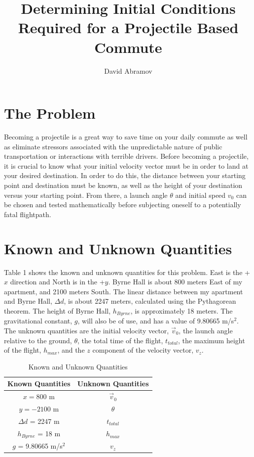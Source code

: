 \documentclass[11pt, oneside]{article}   	%
\title{Determining Initial Conditions Required for a Projectile Based Commute}
\author{David Abramov}
\begin{document}
\maketitle
\section{The Problem}

Becoming a projectile is a great way to save time on your daily commute as well as eliminate stressors associated with the unpredictable nature of public transportation or interactions with terrible drivers. Before becoming a projectile, it is crucial to know what your initial velocity vector must be in order to land at your desired destination. In order to do this, the distance between your starting point and destination must be known, as well as the height of your destination versus your starting point. From there, a launch angle $\theta$ and initial speed $v_{0}$ can be chosen and tested mathematically before subjecting oneself to a potentially fatal flightpath.

\section{Known and Unknown Quantities}

Table 1 shows the known and unknown quantities for this problem. East is the +$x$ direction and North is in the +$y$. Byrne Hall is about 800 meters East of my apartment, and 2100 meters South. The linear distance between my apartment and Byrne Hall, $\Delta d$, is about 2247 meters, calculated using the Pythagorean theorem. The height of Byrne Hall, $h_{Byrne}$, is approximately 18 meters. The gravitational constant, $g$, will also be of use, and has a value of 9.80665 m/s$^2$. The unknown quantities are the initial velocity vector, $\vec{v}_{0}$, the launch angle relative to the ground, $\theta$, the total time of the flight, $t_{total}$, the maximum height of the flight, $h_{max}$, and the $z$ component of the velocity vector, $v_{z}$.

\begin{table}[h!]
\centering
\begin{tabular}{||c | c||} 
 \hline
 Known Quantities & Unknown Quantities \\ [0.5ex] 
 \hline\hline
 $x = 800$ m & $\vec{v}_{0}$ \\ 
 $y = -2100$ m &  $\theta$  \\
 $\Delta d$ = 2247 m & $t_{total}$ \\ 
 $h_{Byrne}$ = 18 m & $h_{max}$\\ 
 $g$ = 9.80665 m/s$^2$& $v_{z}$ \\[1ex] 
 \hline
\end{tabular}
\caption{Known and Unknown Quantities}
\label{table:1}
\end{table}
\end{document}
